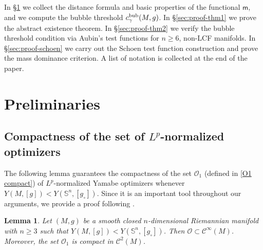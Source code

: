 \documentclass[reqno,11pt]{amsart}
\numberwithin{equation}{section}
\newtheorem{lemma}[theorem]{Lemma}
\theoremstyle{definition}
\theoremstyle{remark}
\newcommand{\Ss}{\mathbb{S}}
\begin{document}
\medskip
{}
In \S\ref{sec:prelim} we collect the distance formula and basic properties of the functional $\mathsf{m}$, 
and we compute the bubble threshold $c_{\gamma}^{\rm bub}(M,g)$. In \S\ref{sec:proof-thm1} we prove 
the abstract existence theorem. In \S\ref{sec:proof-thm2} we verify the bubble threshold condition via 
Aubin's test functions for $n \geqslant 6$, non-LCF manifolds. In \S\ref{sec:proof-schoen} we carry out 
the Schoen test function construction and prove the mass dominance criterion. A list of notation is collected at the end of the paper.


\section{Preliminaries}\label{sec:prelim}


\subsection{Compactness of the set of $L^p$-normalized optimizers} 
The following lemma guarantees the compactness of the set $\mathscr O_1$ (defined in \eqref{O1 compact}) 
of $L^p$-normalized Yamabe optimizers whenever $Y(M,[g]) < Y(\Ss^n,[g_\circ])$. Since it is an important 
tool throughout our arguments, we provide a proof following \cite[Section 4]{LP}. 

\begin{lemma}
    \label{lemma compactness}
    Let $(M,g)$ be a smooth closed $n$-dimensional Riemannian manifold with $n \geqslant 3$ 
    such that $Y(M,[g]) < Y(\Ss^n,[g_\circ])$. Then $\mathscr O \subset \mathcal C^\infty(M)$. 
    Moreover, the set $\mathscr O_1$ is compact in $\mathcal C^2(M)$. 
  \end{lemma}
\end{document}
